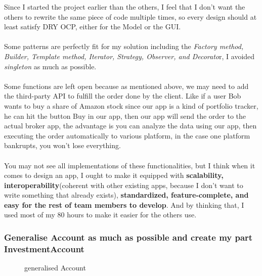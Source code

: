 \documentclass[a4paper,12pt]{report}
\begin{document}
Since I started the project earlier than the others, I feel that I don't want the others to rewrite the same piece of code multiple times, so every design should at least satisfy DRY OCP, either for the Model or the GUI.
%
\\\\Some patterns are perfectly fit for my solution including the \textit{Factory method, Builder, Template method, Iterator, Strategy, Observer, and Decorato}r, I avoided \textit{singleton} as much as possible.
%
\\\\Some functions are left open because as mentioned above, we may need to add the third-party API to fulfill the order done by the client. Like if a user Bob wants to buy a share of Amazon stock since our app is a kind of portfolio tracker,  
he can hit the button Buy in our app, then our app will send the order to the actual broker app, the advantage is you can analyze the data using our app, then executing the order automatically to various platform, in the case one platform bankrupts, you won't lose everything.
%
\\\\You may not see all implementations of these functionalities, but I think when it comes to design an app, I ought to make it equipped with  \textbf{scalability,  interoperability}(coherent with other existing apps, because I don't want to write something that already exists), \textbf{standardized, feature-complete, and easy for the rest of team members to develop}.
And by thinking that, I used most of my 80 hours to make it easier for the others use.
%
\subsubsection{Generalise Account as much as possible and create my part InvestmentAccount}
\begin{figure}[H]
	\centering{}
	\caption{generalised Account}
	\label{img:invAccount}
	\end{figure}
\end{document}
